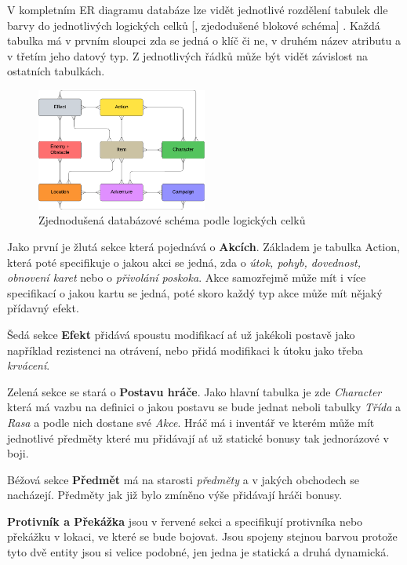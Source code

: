 V kompletním ER diagramu databáze  lze vidět jednotlivé rozdělení tabulek dle barvy do jednotlivých logických celků [, zjedodušené blokové schéma] . Každá tabulka má v prvním sloupci zda se jedná o klíč či ne, v druhém název atributu a v třetím jeho datový typ. Z jednotlivých řádků může být vidět závislost na ostatních tabulkách.

\begin{figure}[h]
    \centering
    \includegraphics[width=0.5\textwidth]{../../shared/diagrams/er_macro.pdf}
    \caption{Zjednodušená databázové schéma podle logických celků}
    \label{fig:database_schema:block}
\end{figure}

Jako první je žlutá sekce která pojednává o \textbf{Akcích}. Základem je tabulka Action, která poté specifikuje o jakou akci se jedná, zda o \textit{útok, pohyb, dovednost, obnovení karet} nebo o \textit{přivolání poskoka}. Akce samozřejmě může mít i více specifikací o jakou kartu se jedná, poté skoro každý typ akce může mít nějaký přídavný efekt.

Šedá sekce \textbf{Efekt} přidává spoustu modifikací ať už jakékoli postavě jako například rezistenci na otrávení, nebo přidá modifikaci k útoku jako třeba \textit{krvácení}.

Zelená sekce se stará o \textbf{Postavu hráče}. Jako hlavní tabulka je zde \textit{Character} která má vazbu na definici o jakou postavu se bude jednat neboli tabulky \textit{Třída} a \textit{Rasa} a podle nich dostane své \textit{Akce}. Hráč má i inventář ve kterém může mít jednotlivé předměty které mu přidávají ať už statické bonusy tak jednorázové v boji.

Béžová sekce \textbf{Předmět} má na starosti \textit{předměty} a v jakých obchodech se nacházejí. Předměty jak již bylo zmíněno výše přidávají hráči bonusy.

\textbf{Protivník a Překážka} jsou v řervené sekci a specifikují protivníka nebo překážku v lokaci, ve které se bude bojovat. Jsou spojeny stejnou barvou protože tyto dvě entity jsou si velice podobné, jen jedna je statická a druhá dynamická.

